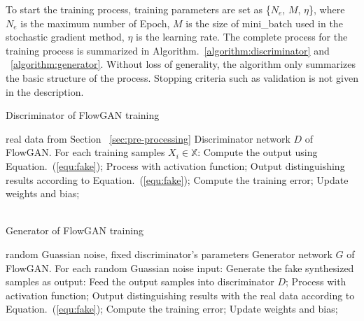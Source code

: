 \documentclass[letterpaper,12pt]{article}
\begin{document}
To start the training process, training parameters are set as \{$N_e$, $M$, $\eta$\}, where $N_e$ is the maximum number of Epoch, $M$ is the size of mini\_batch used in the stochastic gradient method, $\eta$ is the learning rate. The complete process for the training process is summarized in Algorithm.~\ref{algorithm:discriminator} and ~\ref{algorithm:generator}. Without loss of generality, the algorithm only summarizes the basic structure of the process. Stopping criteria such as validation is not given in the description. 



\begin{algorithm}[ht!]  
	\caption{Discriminator of FlowGAN training}  \label{algorithm:discriminator}
	\begin{algorithmic}[1]  
		\REQUIRE real data from Section ~\ref{sec:pre-processing}
		\ENSURE Discriminator network $D$ of FlowGAN.	
		\STATE For each training samples $X_i \in \mathbb{X}$: 
		\STATE Compute the output using Equation.~(\ref{equ:fake});
		\STATE Process with activation function;
		\STATE Output distinguishing results according to Equation.~(\ref{equ:fake});
		\STATE Compute the training error;
		\STATE Update weights and bias;
		\ENDFOR \\ %
		\ENDFOR \\ %
	\end{algorithmic}  
\end{algorithm}  

\begin{algorithm}[ht!]  
	\caption{Generator of FlowGAN training}  \label{algorithm:generator}
	\begin{algorithmic}[1]  
		\REQUIRE random Guassian noise, fixed discriminator's parameters
		\ENSURE Generator network $G$ of FlowGAN.	
		\STATE For each random Guassian noise input: 
		\STATE Generate the fake synthesized samples as output: 
		\STATE Feed the output samples into discriminator $D$;
		\STATE Process with activation function;
		\STATE Output distinguishing results with the real data according to Equation.~(\ref{equ:fake});
		\STATE Compute the training error;
		\STATE Update weights and bias;
		\ENDFOR \\ %
		\ENDFOR \\ %
	\end{algorithmic}  
\end{algorithm}  
\end{document}
